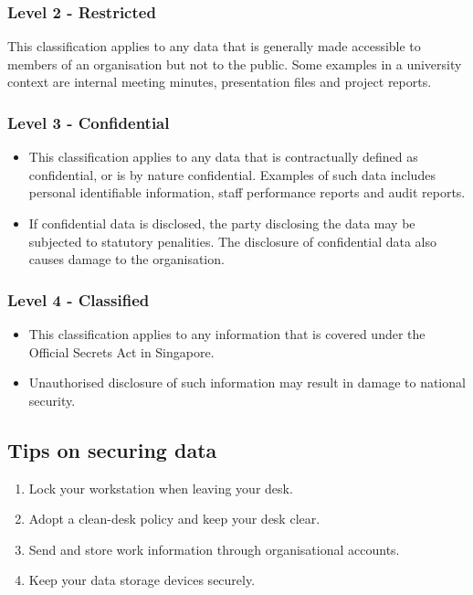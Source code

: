\documentclass[11pt]{article}
\begin{document}
\subsubsection{Level 2 - Restricted}
\label{sec:orgdae0ee1}
This classification applies to any data that is generally made accessible to members of an organisation but not to the public. Some examples in a university context are internal meeting minutes, presentation files and project reports.
\subsubsection{Level 3 - Confidential}
\label{sec:orgec57b33}
\begin{itemize}
\item This classification applies to any data that is contractually defined as confidential, or is by nature confidential. Examples of such data includes personal identifiable information, staff performance reports and audit reports.
\item If confidential data is disclosed, the party disclosing the data may be subjected to statutory penalities. The disclosure of confidential data also causes damage to the organisation.
\end{itemize}
\subsubsection{Level 4 - Classified}
\label{sec:org2567843}
\begin{itemize}
\item This classification applies to any information that is covered under the Official Secrets Act in Singapore.
\item Unauthorised disclosure of such information may result in damage to national security.
\end{itemize}
\subsection{Tips on securing data}
\label{sec:orge7a01db}
\begin{enumerate}
\item Lock your workstation when leaving your desk.
\item Adopt a clean-desk policy and keep your desk clear.
\item Send and store work information through organisational accounts.
\item Keep your data storage devices securely.
\end{enumerate}
\end{document}
